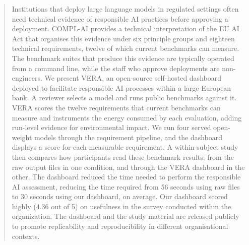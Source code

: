 \documentclass[10pt,conference,a4paper]{IEEEtran}
\begin{document}
\begin{abstract}
Institutions that deploy large language models in regulated settings often need technical evidence of responsible AI practices before approving a deployment.
COMPL-AI provides a technical interpretation of the EU AI Act that organises this evidence under six principle groups and eighteen technical requirements, twelve of which current benchmarks can measure.
The benchmark suites that produce this evidence are typically operated from a command line, while the staff who approve deployments are non-engineers.
We present VERA, an open-source self-hosted dashboard deployed to facilitate responsible AI processes within a large European bank. A reviewer selects a model and runs public benchmarks against it.
VERA scores the twelve requirements that current benchmarks can measure and instruments the energy consumed by each evaluation, adding run-level evidence for environmental impact.
We run four served open-weight models through the requirement pipeline, and the dashboard displays a score for each measurable requirement. A within-subject study then compares how participants read these benchmark results: from the raw output files in one condition, and through the VERA dashboard in the other.
The dashboard reduced the time needed to perform the responsible AI assessment, reducing the time required from 56 seconds using raw files to 30 seconds using our dashboard, on average.
Our dashboard scored highly (4.36 out of 5) on usefulness in the survey conducted within the organization.
The dashboard and the study material are released publicly to promote replicability and reproducibility in different organisational contexts.
\end{abstract}
\end{document}
